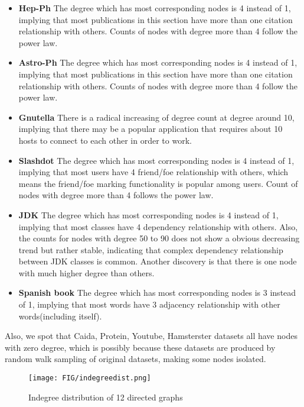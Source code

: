 \begin{itemize}
\item \textbf{Hep-Ph} The degree which has most corresponding nodes is 4 instead of 1, implying that most publications in this section have more than one citation relationship with others. Counts of nodes with degree more than 4 follow the power law.
\item \textbf{Astro-Ph} The degree which has most corresponding nodes is 4 instead of 1, implying that most publications in this section have more than one citation relationship with others. Counts of nodes with degree more than 4 follow the power law.
\item \textbf{Gnutella} There is a radical increasing of degree count at degree around 10, implying that there may be a popular application that requires about 10 hosts to connect to each other in order to work.
\item \textbf{Slashdot} The degree which has most corresponding nodes is 4 instead of 1, implying that most users have 4 friend/foe relationship with others, which means the friend/foe marking functionality is popular among users. Count of nodes with degree more than 4 follows the power law.
\item \textbf{JDK} The degree which has most corresponding nodes is 4 instead of 1, implying that most classes have 4 dependency relationship with others. Also, the counts for nodes with degree 50 to 90 does not show a obvious decreasing trend but rather stable, indicating that complex dependency relationship between JDK classes is common. Another discovery is that there is one node with much higher degree than others.
\item \textbf{Spanish book} The degree which has most corresponding nodes is 3 instead of 1, implying that most words have 3 adjacency relationship with other words(including itself).
\end{itemize}

\par Also, we spot that Caida, Protein, Youtube, Hamsterster datasets all have nodes with zero degree, which is possibly because these datasets are produced by random walk sampling of original datasets, making some nodes isolated.

\begin{figure}[H]
\begin{center}
\texttt{[image: FIG/indegreedist.png]}
\caption{Indegree distribution of 12 directed graphs}
\end{center}
\end{figure}

